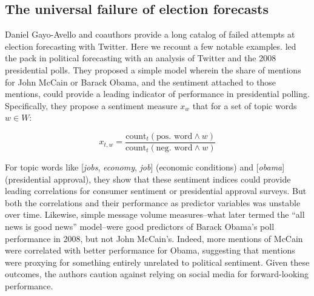 \documentclass{article}
\begin{document}




\subsection{The universal failure of election forecasts}
\label{sec:univ-fail-elect}

Daniel Gayo-Avello and coauthors \citep{gayo2011limits,metaxas2011not}
provide a long catalog of failed attempts at election forecasting with
Twitter. Here we recount a few notable examples. \cite{o2010tweets}
led the pack in political forecasting with an analysis of Twitter and
the 2008 presidential polls. They proposed a simple model wherein the
share of mentions for John McCain or Barack Obama, and the sentiment
attached to those mentions, could provide a leading indicator of
performance in presidential polling. Specifically, they propose a
sentiment measure $x_w$ that for a set of topic words $w \in W$:

\begin{equation}
  \label{eq:2}
  x_{t,w} = \frac{\textrm{count}_t(\textrm{pos. word} \wedge w)}{\textrm{count}_t(\textrm{neg. word} \wedge w)}
\end{equation}

For topic words like [\textit{jobs}, \textit{economy}, \textit{job}]
(economic conditions) and [\textit{obama}] (presidential approval),
they show that these sentiment indices could provide leading
correlations for consumer sentiment or presidential approval
surveys. But both the correlations and their performance as predictor
variables was unstable over time. Likewise, simple message volume
measures--what \citep{digrazia2013} later termed the ``all news is
good news'' model--were good predictors of Barack Obama's poll
performance in 2008, but not John McCain's. Indeed, more mentions of
McCain were correlated with better performance for Obama, suggesting
that mentions were proxying for something entirely unrelated
to political sentiment. Given these
outcomes, the authors caution against relying on social media for
forward-looking performance.
\end{document}
